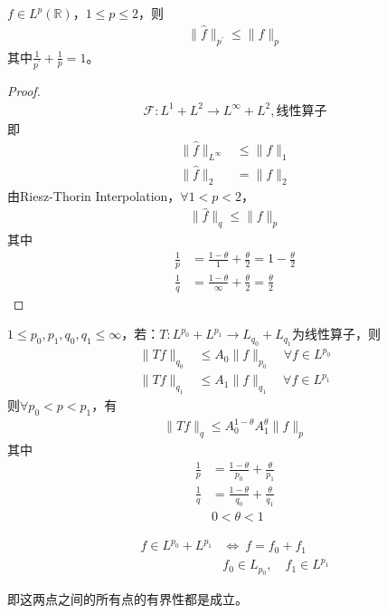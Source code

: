 \begin{theorem}
    $f\in L^p(\mathbb{R})$，$1\leqslant p\leqslant 2$，则
    \begin{align*}
        \|\widehat{f}\|_{p^{\prime}} \leqslant \|f\|_p
    \end{align*}
    其中$\frac{1}{p^{\prime}} + \frac{1}{p} = 1$。
\end{theorem}
\begin{proof}
    \begin{align*}
        \mathcal{F}: L^1 + L^2 \to L^{\infty} + L^2, \text{线性算子}
    \end{align*}
    即
    \begin{align*}
        \|\widehat{f}\|_{L^{\infty}} &\leqslant \|f\|_1 \\
        \|\widehat{f}\|_{2} & = \|f\|_2
    \end{align*}
    由Riesz-Thorin Interpolation，$\forall 1<p<2$，
    \begin{align*}
        \|\widehat{f}\|_q \leqslant \|f\|_p
    \end{align*}
    其中
    \begin{align*}
        \frac{1}{p} &= \frac{1-\theta}{1} + \frac{\theta}{2} = 1 - \frac{\theta}{2} \\
        \frac{1}{q} &= \frac{1-\theta}{\infty} + \frac{\theta}{2} =\frac{\theta}{2}
    \end{align*}
\end{proof}

\begin{theorem}
    $1\leqslant p_0,p_1,q_0,q_1 \leqslant \infty$，若：$T: L^{p_0} + L^{p_1} \to L_{q_0} + L_{q_1}$为线性算子，则
    \begin{align*}
        \|Tf\|_{q_0} &\leqslant A_0 \|f\|_{p_0} \quad \forall f\in L^{p_0} \\
        \|Tf\|_{q_1} & \leqslant A_1 \|f\|_{q_1} \quad \forall f\in L^{p_1}
    \end{align*}
    则$\forall p_0 < p < p_1$，有
    \begin{align*}
        \|Tf\|_q \leqslant A_0^{1-\theta} A_1^{\theta} \|f\|_p
    \end{align*}
    其中
    \begin{align*}
        \frac{1}{p} &= \frac{1-\theta}{p_0} + \frac{\theta}{p_1} \\
        \frac{1}{q} &= \frac{1-\theta}{q_0} + \frac{\theta}{q_1} \\
        & 0<\theta<1
    \end{align*}
\end{theorem}
\begin{remark}
    \begin{align*}
        f\in L^{p_0} + L^{p_1} &\Longleftrightarrow \ f= f_0 + f_1 \\
        & f_0 \in L_{p_0} , \quad f_1 \in L^{p_1}
    \end{align*}

    即这两点之间的所有点的有界性都是成立。
\end{remark}


